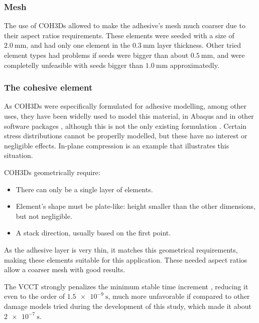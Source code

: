 \subsubsection{Mesh}

The use of \glspl{COH3D} allowed to make the adhesive's mesh much coarser due to their aspect ratios requirements. These elements were seeded with a size of $\SI{2.0}{\mm}$, and had only one element in the $\SI{0.3}{\mm}$ layer thickness. Other tried element types had problems if seeds were bigger than about $\SI{0.5}{\mm}$, and were completelly unfeasible with seeds bigger than $\SI{1.0}{\mm}$ approximatedly.


\subsubsection{The cohesive element}
\label{sec:coh_elem}
\citep{Alfano2001, Greve2007, Carlberger2007, Alvarez2014, May2014}

As \glspl{COH3D} were especifically formulated for adhesive modelling, among other uses, they have been widelly used to model this material, in Abaqus \citep{Sadowski2010, Sadowski2011, Sadowski2014, Alvarez2014} and in other software packages \citep{Sato2000, Carlberger2007, Loureiro2010, Scattina2011, Ghasemnejad2013}, although this is not the only existing formulation \citep{Sato2000, Greve2007, Liao2011, Yang2012}. Certain stress distributions cannot be properlly modelled, but these have no interest or negligible effects. In-plane compression is an example that illustrates this situation.

\Glspl{COH3D} geometrically require:
\begin{itemize}
\item There can only be a single layer of elements.
\item Element's shape must be plate-like: height smaller than the other dimensions, but not negligible.
\item A stack direction, usually based on the first point.
\end{itemize}
As the adhesive layer is very thin, it matches this geometrical requirements, making these elements suitable for this application. These needed aspect ratios allow a coarser mesh with good results.

The \gls{VCCT} strongly penalizes the minimum stable time increment \citep{Abaqus613Manual}, reducing it even to the order of $\SI{1.5e-9}{\s}$, much more unfavorable if compared to other damage models tried during the development of this study, which made it about $\SI{2e-7}{\s}$.

